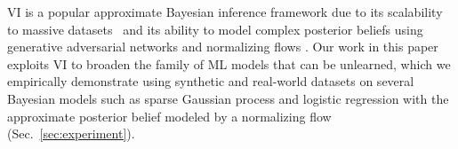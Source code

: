 \documentclass{article}
\theoremstyle{definition}
\begin{document}
VI is a popular approximate Bayesian inference framework due to its scalability to massive datasets~\cite{hensman2013gaussian,hoang2015unifying} and its ability to model complex posterior beliefs using generative adversarial networks \cite{yu19} and normalizing flows \cite{kingma2016improved,rezende2015variational}. 
Our work in this paper exploits VI to broaden the family of ML models that can be unlearned, which we empirically demonstrate using synthetic and real-world datasets on several Bayesian models such as sparse Gaussian process and logistic regression with the approximate posterior belief modeled by a normalizing flow (Sec.~\ref{sec:experiment}).%
%
%
%
\end{document}

